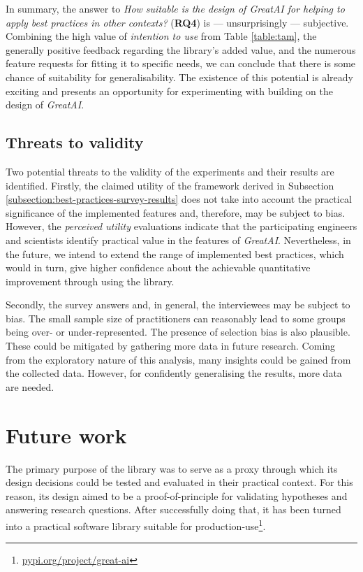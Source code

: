 In summary, the answer to \textit{How suitable is the design of GreatAI for helping to apply best practices in other contexts?} (\textbf{RQ4}) is --- unsurprisingly --- subjective. Combining the high value of \textit{intention to use} from Table \ref{table:tam}, the generally positive feedback regarding the library's added value, and the numerous feature requests for fitting it to specific needs, we can conclude that there is some chance of suitability for generalisability. The existence of this potential is already exciting and presents an opportunity for experimenting with building on the design of \textit{GreatAI}.

\subsection{Threats to validity}

Two potential threats to the validity of the experiments and their results are identified. Firstly, the claimed utility of the framework derived in Subsection \ref{subsection:best-practices-survey-results} does not take into account the practical significance of the implemented features and, therefore, may be subject to bias. However, the \textit{perceived utility} evaluations indicate that the participating engineers and scientists identify practical value in the features of \textit{GreatAI}. Nevertheless, in the future, we intend to extend the range of implemented best practices, which would in turn, give higher confidence about the achievable quantitative improvement through using the library.

Secondly, the survey answers and, in general, the interviewees may be subject to bias. The small sample size of practitioners can reasonably lead to some groups being over- or under-represented. The presence of selection bias is also plausible. These could be mitigated by gathering more data in future research. Coming from the exploratory nature of this analysis, many insights could be gained from the collected data. However, for confidently generalising the results, more data are needed.

\section{Future work} 

The primary purpose of the library was to serve as a proxy through which its design decisions could be tested and evaluated in their practical context. For this reason, its design aimed to be a proof-of-principle for validating hypotheses and answering research questions. After successfully doing that, it has been turned into a practical software library suitable for production-use\footnote{\href{https://pypi.org/project/great-ai/}{pypi.org/project/great-ai}}. 
 
